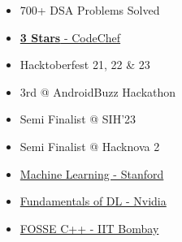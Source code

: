 \documentclass[letterpaper,11pt]{article}
\newcommand\sbullet[1][.5]{\mathbin{\vcenter{\hbox{\scalebox{#1}{$\bullet$}}}}}
\begin{document}
        \begin{multicols}{3}
            \begin{itemize}[itemsep=-4pt]
                \item 700+ DSA Problems Solved
                \item \href{https://www.codechef.com/users/ruthlessruler}{\textbf{3 Stars} - CodeChef {\raisebox{-0.1\height}{\faExternalLink*}} }
                \item Hacktoberfest 21, 22 \& 23
                \item 3rd @ AndroidBuzz Hackathon
                \item Semi Finalist @ SIH'23
                \item Semi Finalist @ Hacknova 2
                \item \href{https://coursera.org/share/c715d24542b410805a2ff3034949858d}{Machine Learning - Stanford {\raisebox{-0.1\height}{\faExternalLink*} }}
                \item \href{https://learn.next.courses.nvidia.com/certificates/b38a698150c5410c9afeb954cf87468c}{Fundamentals of DL - Nvidia {\raisebox{-0.1\height}{\faExternalLink*} }}
                \item \href{https://drive.google.com/file/d/1Oaf6gFga_AUU0Hix6qJHQsRd7Hopzjin/view}{FOSSE C++ - IIT Bombay {\raisebox{-0.1\height}{\faExternalLink*} }}

            \end{itemize}
        \end{multicols}





\end{document}
